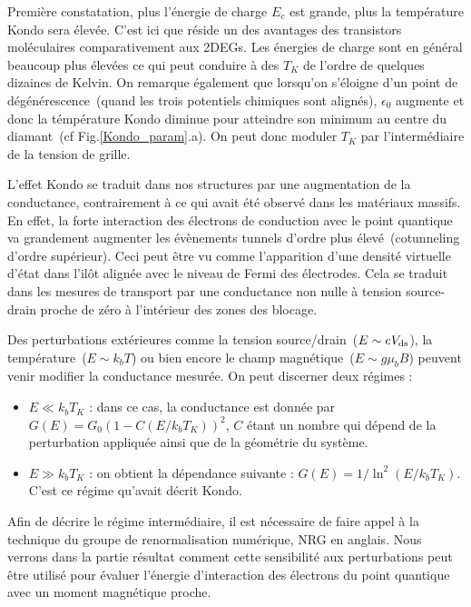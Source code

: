 Première constatation, plus l'énergie de charge $E_c$ est grande, plus la température Kondo sera élevée. C'est ici que réside un des avantages des transistors moléculaires comparativement aux 2DEGs. Les énergies de charge sont en général beaucoup plus élevées ce qui peut conduire à des $T_K$ de l'ordre de quelques dizaines de Kelvin. On remarque également que lorsqu'on s'éloigne d'un point de dégénérescence~(quand les trois potentiels chimiques sont alignés), $\epsilon_0$ augmente et donc la témpérature Kondo diminue pour atteindre son minimum au centre du diamant~(cf Fig.\ref{Kondo_param}.a). On peut donc moduler $T_K$ par l'intermédiaire de la tension de grille.

L'effet Kondo se traduit dans nos structures par une augmentation de la conductance, contrairement à ce qui avait été observé dans les matériaux massifs. En effet, la forte interaction des électrons de conduction avec le point quantique va grandement augmenter les évènements tunnels d'ordre plus élevé~(cotunneling d'ordre supérieur). Ceci peut être vu comme l'apparition d'une densité virtuelle d'état dans l'ilôt alignée avec le niveau de Fermi des électrodes. Cela se traduit dans les mesures de transport par une conductance non nulle à tension source-drain proche de zéro à l'intérieur des zones des blocage. 

Des perturbations extérieures comme la tension source/drain~($E \sim eV_{\rm{ds}}$), la température~($E \sim k_bT$) ou bien encore le champ magnétique~($E \sim g \mu_bB$) peuvent venir modifier la conductance mesurée. On peut discerner deux régimes :
\begin{itemize}
\item $E \ll k_bT_K$ : dans ce cas, la conductance est donnée par $G(E) = G_0(1-C (E/k_bT_K))^2$, $C$ étant un nombre qui dépend de la perturbation appliquée ainsi que de la géométrie du système.
\item $E \gg k_bT_K$ : on obtient la dépendance suivante : $G(E) = 1/\ln^2(E/k_bT_K)$. C'est ce régime qu'avait décrit Kondo.
\end{itemize}
Afin de décrire le régime intermédiaire, il est nécessaire de faire appel à la technique du groupe de renormalisation numérique, NRG en anglais. Nous verrons dans la partie résultat comment cette sensibilité aux perturbations peut \^etre utilisé pour évaluer l'énergie d'interaction des électrons du point quantique avec un moment magnétique proche.